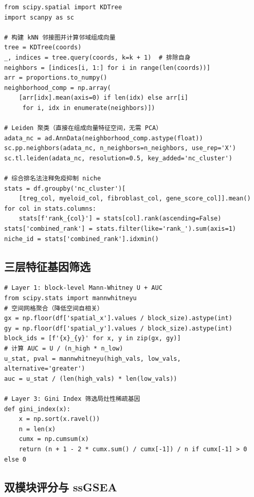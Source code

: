 \documentclass[12pt, a4paper]{ctexart}
\begin{document}
\begin{lstlisting}[caption={邻域组成向量计算、Leiden 聚类与综合排名注释}]
from scipy.spatial import KDTree
import scanpy as sc

# 构建 kNN 邻接图并计算邻域组成向量
tree = KDTree(coords)
_, indices = tree.query(coords, k=k + 1)  # 排除自身
neighbors = [indices[i, 1:] for i in range(len(coords))]
arr = proportions.to_numpy()
neighborhood_comp = np.array(
    [arr[idx].mean(axis=0) if len(idx) else arr[i]
     for i, idx in enumerate(neighbors)])

# Leiden 聚类（直接在组成向量特征空间，无需 PCA）
adata_nc = ad.AnnData(neighborhood_comp.astype(float))
sc.pp.neighbors(adata_nc, n_neighbors=n_neighbors, use_rep='X')
sc.tl.leiden(adata_nc, resolution=0.5, key_added='nc_cluster')

# 综合排名法注释免疫抑制 niche
stats = df.groupby('nc_cluster')[
    [treg_col, myeloid_col, fibroblast_col, gene_score_col]].mean()
for col in stats.columns:
    stats[f'rank_{col}'] = stats[col].rank(ascending=False)
stats['combined_rank'] = stats.filter(like='rank_').sum(axis=1)
niche_id = stats['combined_rank'].idxmin()
\end{lstlisting}

\subsection{三层特征基因筛选}

\begin{lstlisting}[caption={Layer 1 差异检验、Layer 3 Gini Index 计算}]
# Layer 1: block-level Mann-Whitney U + AUC
from scipy.stats import mannwhitneyu
# 空间网格聚合（降低空间自相关）
gx = np.floor(df['spatial_x'].values / block_size).astype(int)
gy = np.floor(df['spatial_y'].values / block_size).astype(int)
block_ids = [f'{x}_{y}' for x, y in zip(gx, gy)]
# 计算 AUC = U / (n_high * n_low)
u_stat, pval = mannwhitneyu(high_vals, low_vals, alternative='greater')
auc = u_stat / (len(high_vals) * len(low_vals))

# Layer 3: Gini Index 筛选局灶性稀疏基因
def gini_index(x):
    x = np.sort(x.ravel())
    n = len(x)
    cumx = np.cumsum(x)
    return (n + 1 - 2 * cumx.sum() / cumx[-1]) / n if cumx[-1] > 0 else 0
\end{lstlisting}

\subsection{双模块评分与 ssGSEA}
\end{document}
